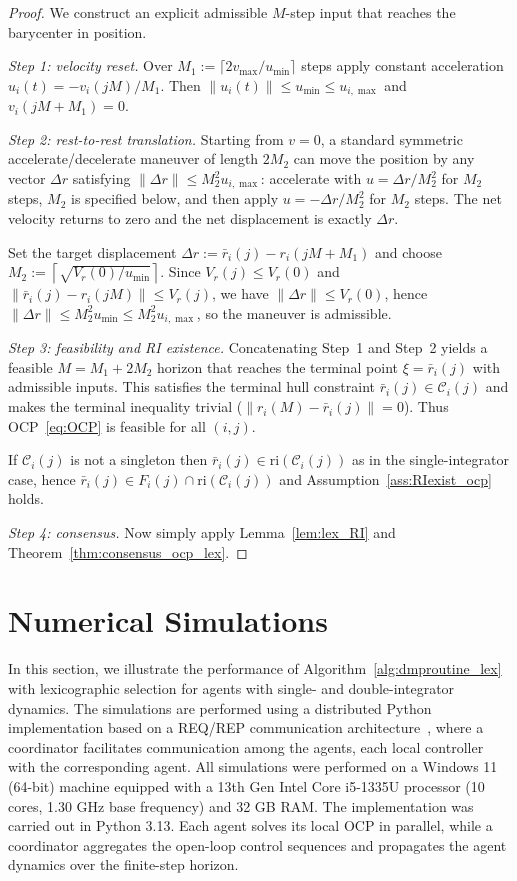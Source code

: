 \documentclass[12pt,draftcls,onecolumn]{IEEEtran}
\def\C{\mathcal{C}}
\def\ri{\mathrm{ri}}
\begin{document}
\begin{proof}
We construct an explicit admissible $M$-step input that reaches the barycenter in position.

\emph{Step 1: velocity reset.}
Over $M_1:=\lceil 2v_{\max}/u_{\min}\rceil$ steps apply constant acceleration
$u_i(t)=-v_i(jM)/M_1$. Then $\|u_i(t)\|\le u_{\min}\le u_{i,\max}$ and $v_i(jM+M_1)=0$.

\emph{Step 2: rest-to-rest translation.}
Starting from $v=0$, a standard symmetric accelerate/decelerate maneuver of length $2M_2$
can move the position by any vector $\Delta r$ satisfying $\|\Delta r\|\le M_2^2 u_{i,\max}$:
accelerate with $u=\Delta r/M_2^2$ for $M_2$ steps, $M_2$ is specified below, and then apply $u=-\Delta r/M_2^2$ for
$M_2$ steps. The net velocity returns to zero and the net displacement is exactly $\Delta r$.

Set the target displacement $\Delta r:=\bar r_i(j)-r_i(jM+M_1)$ and choose
$M_2:=\left\lceil \sqrt{V_r(0)/u_{\min}}\right\rceil$. 
Since $V_r(j)\le V_r(0)$ and
$\|\bar r_i(j)-r_i(jM)\|\le V_r(j)$, we have $\|\Delta r\|\le V_r(0)$, hence
$\|\Delta r\|\le M_2^2 u_{\min}\le M_2^2 u_{i,\max}$, so the maneuver is admissible.

\emph{Step 3: feasibility and RI existence.}
Concatenating Step~1 and Step~2 yields a feasible $M=M_1+2M_2$ horizon that reaches the terminal
point $\xi=\bar r_i(j)$ with admissible inputs. This satisfies the terminal hull constraint
$\bar r_i(j)\in \C_i(j)$ and makes the terminal inequality trivial ($\|r_i(M)-\bar r_i(j)\|=0$).
Thus OCP~\eqref{eq:OCP} is feasible for all $(i,j)$.

If $\C_i(j)$ is not a singleton then $\bar r_i(j)\in\ri(\C_i(j))$ as in the single-integrator case,
hence $\bar r_i(j)\in F_i(j)\cap\ri(\C_i(j))$ and Assumption~\ref{ass:RIexist_ocp} holds.

\emph{Step 4: consensus.}
Now simply apply Lemma~\ref{lem:lex_RI} and Theorem~\ref{thm:consensus_ocp_lex}. 
\end{proof}

\section{Numerical Simulations}\label{sec:numerical-simulations}

In this section, we illustrate the performance of Algorithm~\ref{alg:dmproutine_lex} with lexicographic selection for agents with single- and double-integrator dynamics.
The simulations are performed using a distributed Python implementation based on a REQ/REP communication architecture~\cite{Hintjens.2013.zeromq,zeromq}, where a coordinator facilitates communication among the agents, each local controller with the corresponding agent.
All simulations were performed on a Windows 11 (64-bit) machine equipped with a 13th Gen Intel Core i5-1335U processor (10 cores, 1.30 GHz base frequency) and 32 GB RAM.
The implementation was carried out in Python 3.13.
Each agent solves its local OCP in parallel, while a coordinator aggregates the open-loop control sequences and propagates the agent dynamics over the finite-step horizon.
\end{document}
